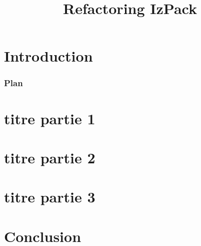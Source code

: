 \documentclass[slidetop,11pt]{beamer}
\title{Refactoring IzPack}
\date{\oldstylenums{\today}}
\begin{document}

\section*{Introduction}

\begin{frame}\frametitle{Plan}
\tableofcontents
\end{frame}
\section{titre partie 1}

\section{titre partie 2}

\section{titre partie 3}

\section*{Conclusion}

\end{document}
